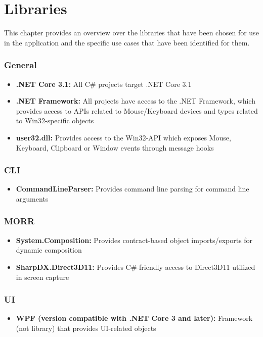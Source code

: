 \chapter{Libraries}
\label{ch:libraries}

\newcommand{\lib}[2]{\item{\textbf{#1: }{#2}}}

This chapter provides an overview over the libraries that have been chosen for use in the application and the specific use cases that have been identified for them.

\subsection*{General}

\begin{itemize}
    \lib{.NET Core 3.1}{All C\# projects target .NET Core 3.1}
    \lib{.NET Framework}{All projects have access to the .NET Framework, which provides access to APIs related to Mouse/Keyboard devices and types related to Win32-specific objects}
    \lib{user32.dll}{Provides access to the Win32-API which exposes Mouse, Keyboard, Clipboard or Window events through message hooks}
\end{itemize}

\subsection*{CLI}

\begin{itemize}
    \lib{CommandLineParser}{Provides command line parsing for command line arguments}
\end{itemize}

\subsection*{MORR}

\begin{itemize}
    \lib{System.Composition}{Provides contract-based object imports/exports for dynamic composition}
    \lib{SharpDX.Direct3D11}{Provides C\#-friendly access to Direct3D11 utilized in screen capture}
\end{itemize}

\subsection*{UI}

\begin{itemize}
    \lib{WPF (version compatible with .NET Core 3 and later)}{Framework (not library) that provides UI-related objects}
\end{itemize}